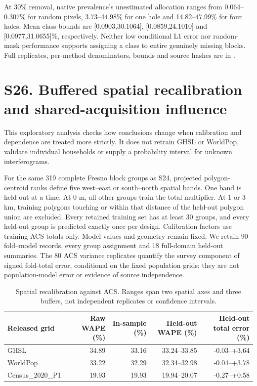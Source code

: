At 30\% removal, native prevalence's unestimated allocation ranges from 0.064--0.307\% for random pixels, 3.73--44.98\% for one hole and 14.82--47.99\% for four holes. Mean class bounds are [0.0903,30.1064], [0.0859,24.1010] and [0.0977,31.0655]\%, respectively. Neither low conditional L1 error nor random-mask performance supports assigning a class to entire genuinely missing blocks. Full replicates, per-method denominators, bounds and source hashes are in .
\clearpage
\section*{S26. Buffered spatial recalibration and shared-acquisition influence}
This exploratory analysis checks how conclusions change when calibration and dependence are treated more strictly. It does not retrain GHSL or WorldPop, validate individual households or supply a probability interval for unknown interferograms.

For the same 319 complete Fresno block groups as S24, projected polygon-centroid ranks define five west--east or south--north spatial bands. One band is held out at a time. At 0 m, all other groups train the total multiplier. At 1 or 3 km, training polygons touching or within that distance of the held-out polygon union are excluded. Every retained training set has at least 30 groups, and every held-out group is predicted exactly once per design. Calibration factors use training ACS totals only. Model values and geometry remain fixed. We retain 90 fold--model records, every group assignment and 18 full-domain held-out summaries. The 80 ACS variance replicates quantify the survey component of signed fold-total error, conditional on the fixed population grids; they are not population-model error or evidence of source independence.
\begin{table}[htbp]\centering\small
\caption{Spatial recalibration against ACS. Ranges span two spatial axes and three buffers, not independent replicates or confidence intervals.}
\begin{tabular}{lrrrr}\toprule
Released grid & Raw WAPE (\%) & In-sample (\%) & Held-out WAPE (\%) & Held-out total error (\%) \\\midrule
GHSL & 34.89 & 33.16 & 33.24--33.85 & -0.03--+3.64 \\
WorldPop & 33.22 & 32.29 & 32.34--32.98 & -0.04--+3.78 \\
Census\_2020\_P1 & 19.93 & 19.93 & 19.94--20.07 & -0.27--+0.58 \\
\bottomrule\end{tabular}
\end{table}

